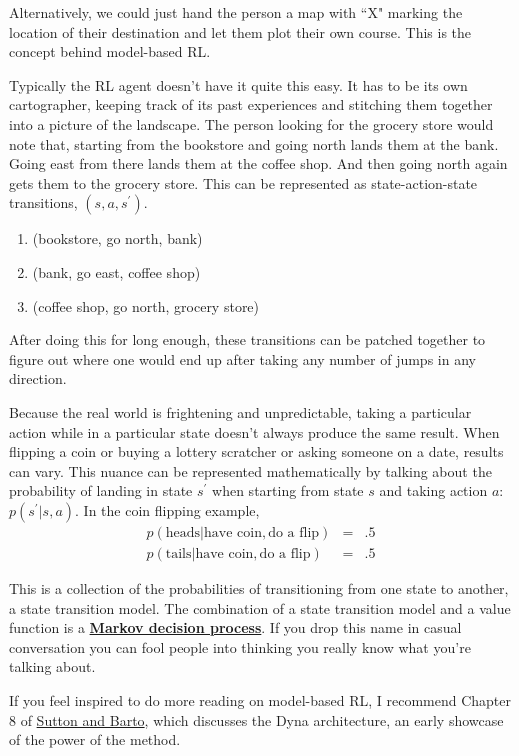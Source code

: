 Alternatively, we could just hand the person a map with ``X" marking the
location of their destination and let them plot their own course.
This is the concept behind model-based RL.

Typically the RL agent doesn't have it quite this easy. It has to be
its own cartographer, keeping track of its past experiences and stitching
them together into a picture of the landscape. The person looking for the
grocery store would note that, starting from the bookstore and going
north lands them at the bank. Going east from there lands them at the
coffee shop. And then going north again gets them to the grocery store.
This can be represented as state-action-state transitions, $(s, a, s^\prime)$.
\begin{enumerate}
  \item{(bookstore, go north, bank)}
  \item{(bank, go east, coffee shop)}
  \item{(coffee shop, go north, grocery store)}
\end{enumerate}
After doing this for long enough, these transitions can be patched together
to figure out where one would end up after taking any number
of jumps in any direction.

Because the real world is frightening and unpredictable, taking a particular
action while in a particular state doesn't always produce the same result.
When flipping a coin or buying a lottery scratcher or asking someone on
a date, results can vary. This nuance can be represented mathematically by
talking about the probability of landing in state $s^\prime$ when starting
from state $s$ and taking action $a$: $p(s^\prime | s, a)$.
In the coin flipping example,
\begin{eqnarray*}
p(\mbox{heads} | \mbox{have coin}, \mbox{do a flip}) &=& .5 \\
p(\mbox{tails} | \mbox{have coin}, \mbox{do a flip}) &=& .5
\end{eqnarray*}

This is a collection of the probabilities of transitioning from one state
to another, a state transition model. The combination of a state transition
model and a value function is a
\textbf{\href{https://en.m.wikipedia.org/wiki/Markov_decision_process}{Markov decision process}}.
If you drop this name in casual conversation you can fool people into thinking
you really know what you're talking about.

If you feel inspired to do more reading on model-based RL,
I recommend Chapter 8 of
\href{http://incompleteideas.net/book/RLbook2020.pdf}{Sutton and Barto},
which discusses the Dyna architecture, an early showcase of
the power of the method.

